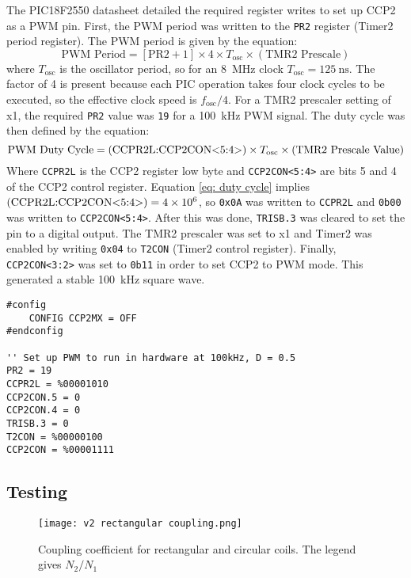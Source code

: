 The PIC18F2550 datasheet \cite{pic18f2550} detailed the required register writes to set up CCP2 as a PWM pin. First, the PWM period was written to the \verb|PR2| register (Timer2 period register). The PWM period is given by the equation:
\begin{equation}
\text{PWM Period} = [\text{PR2}+1] \times 4 \times T_\text{osc} \times (\text{TMR2 Prescale})
\end{equation}
where $T_\text{osc}$ is the oscillator period, so for an \SI{8}{\mega\hertz} clock $T_\text{osc}=\SI{125}{\nano\second}$. The factor of 4 is present because each PIC operation takes four clock cycles to be executed, so the effective clock speed is $f_\text{osc}/4$. For a TMR2 prescaler setting of x1, the required \verb|PR2| value was \verb|19| for a \SI{100}{\kilo\hertz} PWM signal. The duty cycle was then defined by the equation:
\begin{equation}
\text{PWM Duty Cycle} = (\text{CCPR2L:CCP2CON\textless5:4\textgreater}) \times T_\text{osc} \times (\text{TMR2 Prescale Value}) \label{eq: duty cycle}
\end{equation}
Where \verb|CCPR2L| is the CCP2 register low byte and \verb|CCP2CON<5:4>| are bits 5 and 4 of the CCP2 control register. Equation \ref{eq: duty cycle} implies $(\text{CCPR2L:CCP2CON\textless5:4\textgreater}) = \num{4e6}$, so \verb|0x0A| was written to \verb|CCPR2L| and \verb|0b00| was written to \verb|CCP2CON<5:4>|. After this was done, \verb|TRISB.3| was cleared to set the pin to a digital output. The TMR2 prescaler was set to x1 and Timer2 was enabled by writing \verb|0x04| to \verb|T2CON| (Timer2 control register). Finally, \verb|CCP2CON<3:2>| was set to \verb|0b11| in order to set CCP2 to PWM mode. This generated a stable \SI{100}{\kilo\hertz} square wave.

\begin{lstlisting}
#config
    CONFIG CCP2MX = OFF
#endconfig

'' Set up PWM to run in hardware at 100kHz, D = 0.5
PR2 = 19
CCPR2L = %00001010
CCP2CON.5 = 0
CCP2CON.4 = 0
TRISB.3 = 0
T2CON = %00000100
CCP2CON = %00001111
\end{lstlisting}




\subsection{Testing}
\begin{figure}[htb]
	\centering
	\texttt{[image: v2 rectangular coupling.png]}
	\caption{Coupling coefficient for rectangular and circular coils. The legend gives $N_2/N_1$}
	\label{fig: rectangular coupling}
\end{figure}


